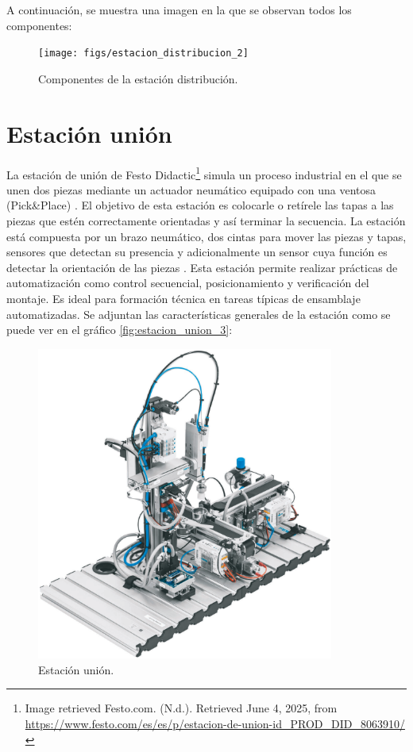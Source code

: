 A continuación, se muestra una imagen en la que se observan todos los componentes:

\begin{figure} [h!]
  \begin{center}
    \texttt{[image: figs/estacion\_distribucion\_2]}
  \end{center}
  \caption{\centering Componentes de la estación distribución.}
  \label{fig:estacion_distribucion_2}
\end{figure} 

\section{Estación unión}
\label{sec:estacion_union}

La estación de unión de Festo Didactic\footnote{Image retrieved Festo.com.  (N.d.). Retrieved June 4, 2025, from  \url{https://www.festo.com/es/es/p/estacion-de-union-id_PROD_DID_8063910/}} simula un proceso industrial en el que se unen dos piezas mediante un actuador neumático equipado con una ventosa (Pick\&Place) \cite{estacion_union}. El objetivo de esta estación es colocarle o retírele las tapas a las piezas que estén correctamente orientadas y así terminar la secuencia. La estación está compuesta por un brazo neumático, dos cintas para mover las piezas y tapas, sensores que detectan su presencia y adicionalmente un sensor cuya función es detectar la orientación de las piezas \cite{estacion_union}. Esta estación permite realizar prácticas de automatización como control secuencial, posicionamiento y verificación del montaje. Es ideal para formación técnica en tareas típicas de ensamblaje automatizadas. Se adjuntan las características generales de la estación como se puede ver en el gráfico \ref{fig:estacion_union_3}:


\begin{figure} [h!]
  \begin{center}
    \includegraphics[width=9.75cm]{figs/estacion_union_1}
  \end{center}
  \caption{\centering Estación unión. \cite{estacion_union}}
  \label{fig:estacion_union_1}
\end{figure} 

